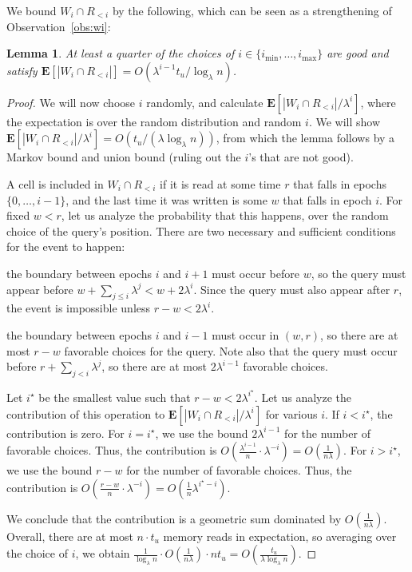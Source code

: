 \documentclass[letterpaper,11pt]{article}
\newenvironment{itemize*}{\vspace{-1ex}\begin{itemize}\setlength{\itemsep}{-0.5ex}\setlength{\parsep}{0pt}}{\end{itemize}}
\newtheorem{lemma}[theorem]{Lemma}
\newcommand{\imax}{{i_{\max}}}
\newcommand{\imin}{{i_{\min}}}
\newcommand{\E}{\mathbf{E}}
\begin{document}
We bound $W_i \cap R_{<i}$ by the following, which can be seen as a
strengthening of Observation~\ref{obs:wi}:
\begin{lemma}   \label{lem:riwi}
At least a quarter of the choices of $i \in \{ \imin, \dots, \imax \}$
are good and satisfy $\E[ | W_i \cap R_{< i} |] = O(\lambda^{i-1} t_u
/ \log_\lambda n)$.
\end{lemma}

\begin{proof}
We will now choose $i$ randomly, and calculate $\E[ |W_i \cap R_{<i}|
  / \lambda^i]$, where the expectation is over the random distribution
and random $i$. We will show $\E[ |W_i \cap R_{<i}| / \lambda^i] =
O(t_u / (\lambda \log_\lambda n))$, from which the lemma follows by a
Markov bound and union bound (ruling out the $i$'s that are not good).

A cell is included in $W_i \cap R_{<i}$ if it is read at some time $r$
that falls in epochs $\{0, \dots, i-1\}$, and the last time it was
written is some $w$ that falls in epoch $i$. For fixed $w<r$, let us
analyze the probability that this happens, over the random choice of
the query's position. There are two necessary and sufficient
conditions for the event to happen:
\begin{itemize*}
\item the boundary between epochs $i$ and $i+1$ must occur before $w$,
  so the query must appear before $w + \sum_{j\le i} \lambda^j < w +
  2\lambda^i$. Since the query must also appear after $r$, the event
  is impossible unless $r-w < 2\lambda^i$.
  
\item the boundary between epochs $i$ and $i-1$ must occur in $(w,r)$,
  so there are at most $r-w$ favorable choices for the query. Note
  also that the query must occur before $r + \sum_{j<i} \lambda^j$, so
  there are at most $2\lambda^{i-1}$ favorable choices.
\end{itemize*}
Let $i^\star$ be the smallest value such that $r-w <
2\lambda^{i^\star}$.  Let us analyze the contribution of this
operation to $\E[ |W_i \cap R_{<i}| / \lambda^i]$ for various $i$.  If
$i < i^\star$, the contribution is zero. For $i = i^\star$, we use
the bound $2\lambda^{i-1}$ for the number of favorable choices. Thus,
the contribution is $O(\frac{\lambda^{i-1}}{n} \cdot \lambda^{-i}) =
O(\frac{1}{n\lambda})$. For $i > i^\star$, we use the bound $r-w$ for
the number of favorable choices. Thus, the contribution is
$O(\frac{r-w}{n} \cdot \lambda^{-i}) = O(\frac{1}{n} \lambda^{i^\star
  - i})$.

We conclude that the contribution is a geometric sum dominated by
$O(\frac{1}{n\lambda})$. Overall, there are at most $n \cdot t_u$
memory reads in expectation, so averaging over the choice of $i$, we
obtain $\frac{1}{\log_\lambda n} \cdot O(\frac{1}{n\lambda}) \cdot
nt_u = O(\frac{t_u}{\lambda \log_{\lambda} n})$.
\end{proof}
\end{document}
